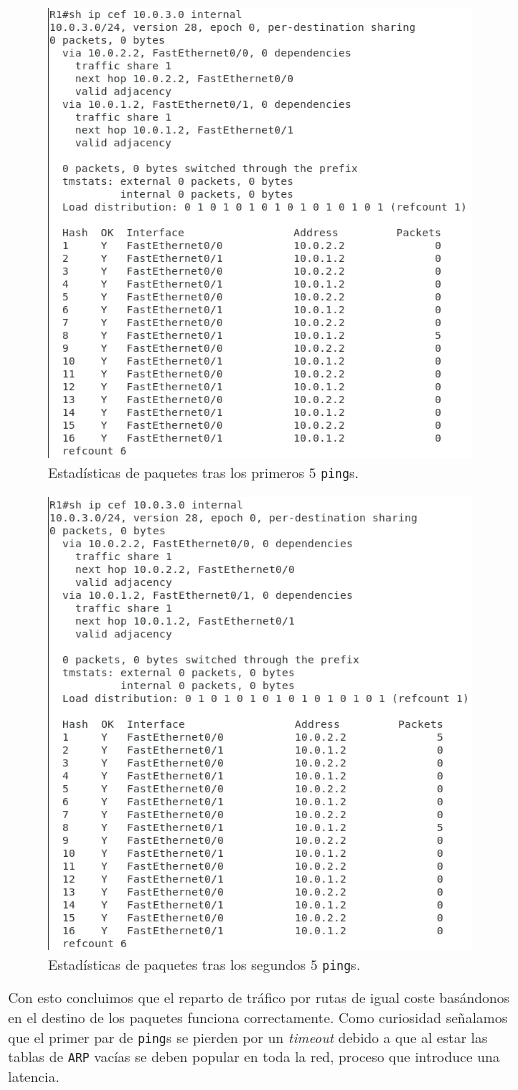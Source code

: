 \documentclass[11pt]{article}
\begin{document}
            \begin{figure}
                \centering
                \includegraphics[width=0.6\linewidth]{ping1PktStats.png}
                \caption{Estadísticas de paquetes tras los primeros $5$ \texttt{ping}s.}
                \label{fig:ping1PktStats}
            \end{figure}

            \begin{figure}
                \centering
                \includegraphics[width=0.6\linewidth]{ping2PktStats.png}
                \caption{Estadísticas de paquetes tras los segundos $5$ \texttt{ping}s.}
                \label{fig:ping2PktStats}
            \end{figure}

            Con esto concluimos que el reparto de tráfico por rutas de igual coste basándonos en el destino de los paquetes funciona correctamente. Como curiosidad señalamos que el primer par de \texttt{ping}s se pierden por un \textit{timeout} debido a que al estar las tablas de \texttt{ARP} vacías se deben popular en toda la red, proceso que introduce una latencia.
\end{document}
